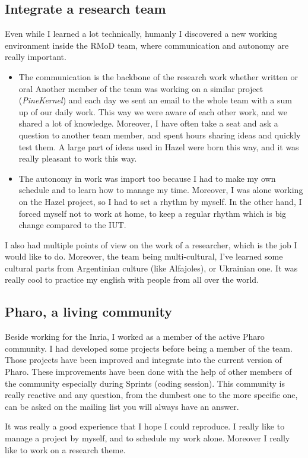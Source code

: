 \subsection{Integrate a research team}

Even while I  learned a lot technically, humanly I  discovered a new working environment inside the RMoD team, where communication and autonomy are really important.
\begin{itemize}
	\item The communication is the backbone of the research work whether written or oral Another member of the team was working on a similar project (\emph{PineKernel}) and each day we sent an email to the whole team with a sum up of our daily work. This way we were aware of each other work, and we shared a lot of knowledge. Moreover, I have often take a seat and ask a question to another team member, and spent hours sharing ideas and quickly test them. A large part of ideas used in Hazel were born this way, and it was really pleasant to work this way. 
	\item The autonomy in work was import too because I had to make my own schedule and to learn how to manage my time. Moreover, I was alone working on the Hazel project, so I had to set a rhythm by myself. In the other hand, I forced myself not to work at home, to keep a regular rhythm which is big change compared to the \gls{IUT}.
\end{itemize}

I also had multiple points of view on the work of a researcher, which is the job I would like to do. Moreover, the team being multi-cultural, I've learned some cultural parts from Argentinian culture (like Alfajoles), or Ukrainian one. It was really cool to practice my english with people from all over the world.

\subsection{Pharo, a living community}

Beside working for the Inria, I worked as a member of the active \gls{Pharo} community. I had developed some projects before being a member of the team. Those projects have been improved and integrate into the current version of \gls{Pharo}. These improvements have been done with the help of other members of the community especially during Sprints (coding session). This community is really reactive and any question, from the dumbest one to the more specific one, can be asked on the mailing list you will always have an answer.


\inanutshell It was really a good experience that I hope I could reproduce. I really like to manage a project by myself, and to schedule my work alone. Moreover I really like to work on a research theme.